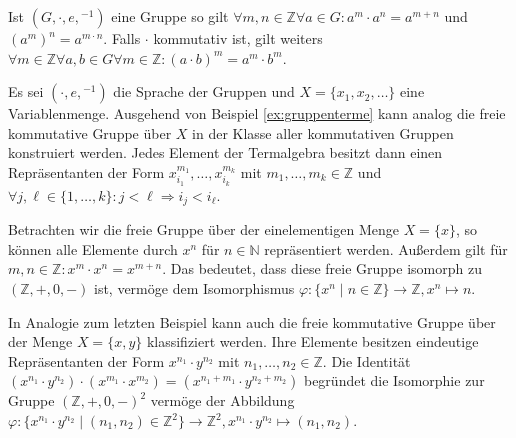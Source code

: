 \begin{remark}
    Ist $(G,\cdot,e,{}^{-1})$ eine Gruppe so gilt $\forall m,n\in\mathbb{Z}\forall a\in G:a^m\cdot a^n=a^{m+n}$ und $(a^m)^n=a^{m\cdot n}$.
    Falls $\cdot$ kommutativ ist, gilt weiters $\forall m\in\mathbb{Z}\forall a,b\in G\forall m\in\mathbb{Z}:(a\cdot b)^m=a^m\cdot b^m$.
\end{remark}

\begin{example}
    Es sei $(\cdot,e,{}^{-1})$ die Sprache der Gruppen und $X=\{x_1,x_2,\ldots\}$ eine Variablenmenge.
    Ausgehend von Beispiel \ref{ex:gruppenterme} kann analog die freie kommutative Gruppe über $X$ in der Klasse
    aller kommutativen Gruppen konstruiert werden. Jedes Element der Termalgebra besitzt dann einen Repräsentanten
    der Form $x_{i_1}^{m_1},\ldots,x_{i_{k}}^{m_k}$ mit $m_1,\ldots,m_k\in \mathbb{Z}$ und $\forall j,\ell\in\{1,\ldots,k\}:j<\ell\Rightarrow i_j<i_\ell$.
\end{example}

\begin{example}
    Betrachten wir die freie Gruppe über der einelementigen Menge $X=\{x\}$, so können alle Elemente durch $x^n$ für
    $n\in\mathbb{N}$ repräsentiert werden. Außerdem gilt für $m,n\in\mathbb{Z}:x^m\cdot x^n=x^{m+n}$. Das bedeutet,
    dass diese freie Gruppe isomorph zu $(\mathbb{Z},+,0,-)$ ist, vermöge dem Isomorphismus $\varphi:\{x^n\mid n\in\mathbb{Z}\}\to \mathbb{Z},x^n\mapsto n$.
\end{example}

\begin{example}
    In Analogie zum letzten Beispiel kann auch die freie kommutative Gruppe über der Menge $X=\{x,y\}$ klassifiziert werden.
    Ihre Elemente besitzen eindeutige Repräsentanten der Form $x^{n_1}\cdot y^{n_2}$ mit $n_1,\ldots,n_2\in\mathbb{Z}$.
    Die Identität $(x^{n_1}\cdot y^{n_2})\cdot (x^{m_1}\cdot x^{m_2})=(x^{n_1+m_1}\cdot y^{n_2+m_2})$ begründet die Isomorphie
    zur Gruppe $(\mathbb{Z},+,0,-)^2$ vermöge der Abbildung $\varphi:\{x^{n_1}\cdot y^{n_2}\mid (n_1,n_2)\in\mathbb{Z}^2\}\to \mathbb{Z}^2,x^{n_1}\cdot y^{n_2}\mapsto (n_1,n_2)$.
\end{example}

